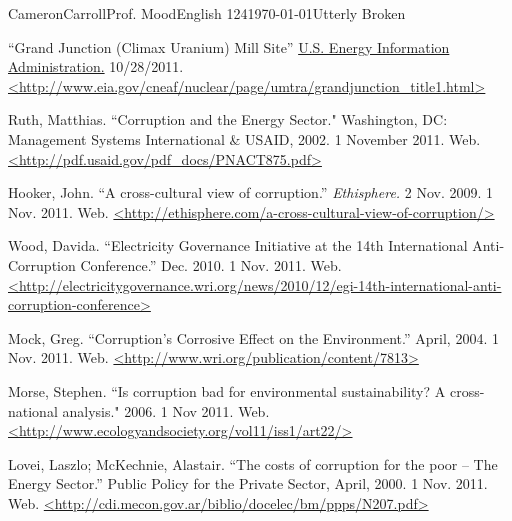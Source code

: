 \begin{mla}{Cameron}{Carroll}{Prof. Mood}{English 124}{\today}{Utterly Broken}
\begin{workscited}
\bibent
``Grand Junction (Climax Uranium) Mill Site'' \underline{U.S. Energy Information Administration.} 10/28/2011. \url{<http://www.eia.gov/cneaf/nuclear/page/umtra/grandjunction_title1.html>}

\bibent
Ruth, Matthias. ``Corruption and the Energy Sector." Washington, DC: Management Systems International \& USAID, 2002. 1 November 2011. Web. \url{<http://pdf.usaid.gov/pdf_docs/PNACT875.pdf>}

\bibent
Hooker, John. ``A cross-cultural view of corruption.'' \emph{Ethisphere.} 2 Nov. 2009. 1 Nov. 2011. Web. \url{<http://ethisphere.com/a-cross-cultural-view-of-corruption/>}

\bibent
Wood, Davida. ``Electricity Governance Initiative at the 14th International Anti-Corruption Conference.'' Dec. 2010. 1 Nov. 2011. Web. \url{<http://electricitygovernance.wri.org/news/2010/12/egi-14th-international-anti-corruption-conference>}

\bibent
Mock, Greg. ``Corruption's Corrosive Effect on the Environment.'' April, 2004. 1 Nov. 2011. Web. \url{<http://www.wri.org/publication/content/7813>}

\bibent
Morse, Stephen. ``Is corruption bad for environmental sustainability? A cross-national analysis." 2006. 1 Nov 2011. Web. \url{<http://www.ecologyandsociety.org/vol11/iss1/art22/>}

\bibent
Lovei, Laszlo; McKechnie, Alastair. ``The costs of corruption for the poor -- The Energy Sector.'' Public Policy for the Private Sector, April, 2000. 1 Nov. 2011. Web. \url{<http://cdi.mecon.gov.ar/biblio/docelec/bm/ppps/N207.pdf>}


\end{workscited}

\end{mla}
